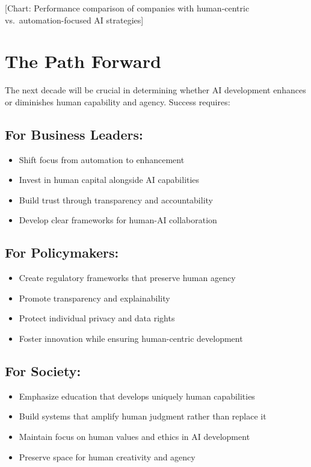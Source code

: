 \documentclass[
  Letterpaper,
]{scrbook}
\providecommand{\tightlist}{%
  \setlength{\itemsep}{0pt}\setlength{\parskip}{0pt}}\usepackage{longtable,booktabs,array}
\begin{document}
{[}Chart: Performance comparison of companies with human-centric
vs.~automation-focused AI strategies{]}

\section{The Path Forward}\label{the-path-forward}

The next decade will be crucial in determining whether AI development
enhances or diminishes human capability and agency. Success requires:

\subsection{For Business Leaders:}\label{for-business-leaders}

\begin{itemize}
\tightlist
\item
  Shift focus from automation to enhancement
\item
  Invest in human capital alongside AI capabilities
\item
  Build trust through transparency and accountability
\item
  Develop clear frameworks for human-AI collaboration
\end{itemize}

\subsection{For Policymakers:}\label{for-policymakers}

\begin{itemize}
\tightlist
\item
  Create regulatory frameworks that preserve human agency
\item
  Promote transparency and explainability
\item
  Protect individual privacy and data rights
\item
  Foster innovation while ensuring human-centric development
\end{itemize}

\subsection{For Society:}\label{for-society}

\begin{itemize}
\tightlist
\item
  Emphasize education that develops uniquely human capabilities
\item
  Build systems that amplify human judgment rather than replace it
\item
  Maintain focus on human values and ethics in AI development
\item
  Preserve space for human creativity and agency
\end{itemize}
\end{document}
